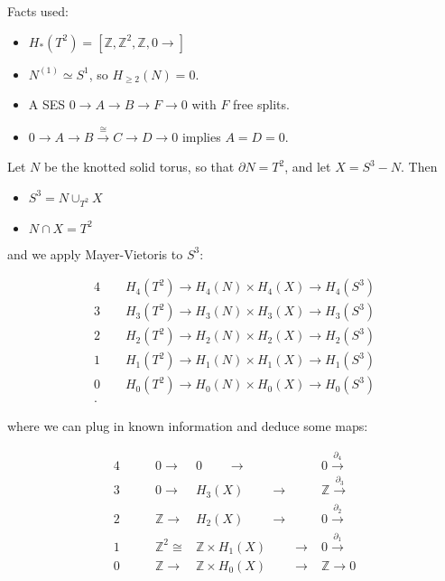 \begin{solution}

Facts used:

\begin{itemize}
\tightlist
\item
  \(H_*(T^2) = [{\mathbb{Z}}, {\mathbb{Z}}^2, {\mathbb{Z}}, 0\rightarrow]\)
\item
  \(N^{(1)} \simeq S^1\), so \(H_{\geq 2}(N) = 0\).
\item
  A SES \(0\to A\to B \to F \to 0\) with \(F\) free splits.
\item
  \(0\to A \to B \xrightarrow{\cong} C \to D \to 0\) implies
  \(A = D = 0\).
\end{itemize}

Let \(N\) be the knotted solid torus, so that \({\partial}N = T^2\), and
let \(X = S^3 - N\). Then

\begin{itemize}
\tightlist
\item
  \(S^3 = N \cup_{T^2} X\)
\item
  \(N \cap X = T^2\)
\end{itemize}

and we apply Mayer-Vietoris to \(S^3\):

\begin{align*} 4\qquad H_4(T^2) \to H_4(N) \times H_4(X) \to H_4(S^3) \\ 3\qquad H_3(T^2) \to H_3(N) \times H_3(X) \to H_3(S^3) \\ 2\qquad H_2(T^2) \to H_2(N) \times H_2(X) \to H_2(S^3) \\ 1\qquad H_1(T^2) \to H_1(N) \times H_1(X) \to H_1(S^3) \\ 0\qquad H_0(T^2) \to H_0(N) \times H_0(X) \to H_0(S^3) \\ .\end{align*}

where we can plug in known information and deduce some maps:

\begin{align} 4\qquad &0 \to &0 \qquad\to &0 \xrightarrow{{\partial}_4} \\ 3\qquad &0 \to &H_3(X) \qquad\to &{\mathbb{Z}}\xrightarrow{{\partial}_3}\\ 2\qquad &{\mathbb{Z}}\to &H_2(X) \qquad\to &0 \xrightarrow{{\partial}_2}\\ 1\qquad &{\mathbb{Z}}^2 \cong &{\mathbb{Z}}\times H_1(X) \qquad\to &0 \xrightarrow{{\partial}_1}\\ 0\qquad &{\mathbb{Z}}\to &{\mathbb{Z}}\times H_0(X) \qquad\to &{\mathbb{Z}}\to 0 \\ \end{align}


\end{solution}
